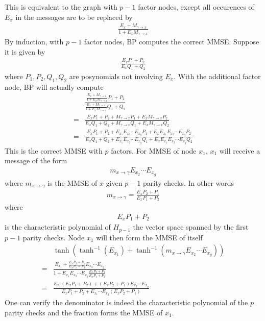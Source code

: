 \documentclass[12pt]{article}
\begin{document}
This is equivalent to the graph with $p-1$ factor nodes, except all occurences of $E_x$ in the messages are to be replaced by
\begin{align*}
\frac{E_x + M_{\gamma\rightarrow x}}{1+E_xM_{\gamma\rightarrow x}}
\end{align*}
By induction, with $p-1$ factor nodes, BP computes the correct MMSE. Suppose it is given by
\begin{align*}
\frac{E_xP_1+P_2}{E_xQ_1+Q_2}
\end{align*}
where $P_1, P_2, Q_1, Q_2$ are posynomials not involving $E_x$. With the additional factor node, BP will actually compute
\begin{align*}
&\frac{\frac{E_x + M_{\gamma\rightarrow x}}{1+E_xM_{\gamma\rightarrow x}}P_1+P_2}{\frac{E_x + M_{\gamma\rightarrow x}}{1+E_xM_{\gamma\rightarrow x}}Q_1+Q_2}\\
=&\frac{E_xP_1+P_2+M_{\gamma\rightarrow x}P_1 + E_xM_{\gamma\rightarrow x}P_2}{E_xQ_1+Q_2+M_{\gamma\rightarrow x}Q_1 + E_xM_{\gamma\rightarrow x}Q_2}\\
=&\frac{E_xP_1+P_2+E_{x_1}E_{x_2}\cdots E_{x_g}P_1 + E_xE_{x_1}E_{x_2}\cdots E_{x_g}P_2}{E_xQ_1+Q_2+E_{x_1}E_{x_2}\cdots E_{x_g}Q_1 + E_xE_{x_1}E_{x_2}\cdots E_{x_g}Q_2}
\end{align*}
This is the correct MMSE with $p$ factors. For MMSE of node $x_1$, $x_1$ will receive a message of the form
\begin{align*}
m_{x\rightarrow\gamma}E_{x_2}\cdots E_{x_g}
\end{align*}
where $m_{x\rightarrow\gamma}$ is the MMSE of $x$ given $p-1$ parity checks. In other words
\begin{align}
m_{x\rightarrow\gamma} = \frac{E_xP_2+P_1}{E_xP_1+P_2}
\end{align}
where 
\begin{align*}
E_xP_1+P_2
\end{align*}
is the characteristic polynomial of $H_{p-1}$ the vector space spanned by the first $p-1$ parity checks. Node $x_1$ will then form the MMSE of itself
\begin{align}
&\tanh\left(\tanh^{-1}(E_{x_1})+\tanh^{-1}\left(m_{x\rightarrow\gamma}E_{x_2}\cdots E_{x_g}\right)\right)\\
=&\frac{E_{x_1}+\frac{E_xP_2+P_1}{E_xP_1+P_2}E_{x_2}\cdots E_{x_g}}{1+E_{x_1}E_{x_2}\cdots E_{x_g}\frac{E_xP_2+P_1}{E_xP_1+P_2}}\\
=&\frac{E_{x_1}(E_xP_1+P_2)+(E_xP_2+P_1)E_{x_2}\cdots E_{x_g}}{E_xP_1+P_2+E_{x_1}\cdots E_{x_g}(E_xP_2+P_1)}
\end{align}
One can verify the denominator is indeed the characteristic polynomial of the $p$ parity checks and the fraction forms the MMSE of $x_1$.
\end{document}
